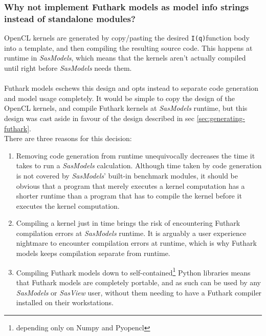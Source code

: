 \documentclass[11pt]{article}
\newcommand{\sasmodels}{\textit{SasModels}}
\newcommand{\sasview}{\textit{SasView}}
\newcommand{\iq}{\texttt{I(q)}}
\begin{document}
\subsubsection{Why not implement Futhark models as model info strings 
instead of standalone modules?}
OpenCL kernels are generated by copy/pasting the desired \iq function body
into a template, and then compiling the resulting source code.
This happens at runtime in \sasmodels, which means that the kernels aren't
 actually compiled until right before \sasmodels{} needs them.
\\\\
Futhark models eschews this design and opts instead to separate code generation
and model usage completely.
It would be simple to copy the design of the OpenCL kernels, and compile Futhark
kernels at \sasmodels{} runtime, but this design was cast aside in favour of the
design described in sec \ref{sec:generating-futhark}.
\\
There are three reasons for this decision:
\begin{enumerate}
  \item Removing code generation from runtime unequivocally decreases the time
  it takes to run a \sasmodels{} calculation. Although time taken by code 
  generation is not covered by \sasmodels' built-in benchmark modules, it should
  be obvious that a program that merely executes a kernel computation has a 
  shorter runtime than a program that has to compile the kernel before it
  executes the kernel computation.
  
  \item Compiling a kernel just in time brings the risk of encountering 
  Futhark compilation errors at \sasmodels{} runtime. 
  It is arguably a user experience nightmare to encounter compilation errors at 
  runtime, which is why Futhark models keeps compilation separate from runtime.
  
  \item Compiling Futhark models down to self-contained\footnote{depending only 
  on Numpy and Pyopencl} Python libraries means that Futhark models are 
  completely portable, and as such can be used by any \sasmodels{} or \sasview{} 
  user, without them needing to have a Futhark compiler installed on their 
  workstations.
\end{enumerate}
\end{document}
